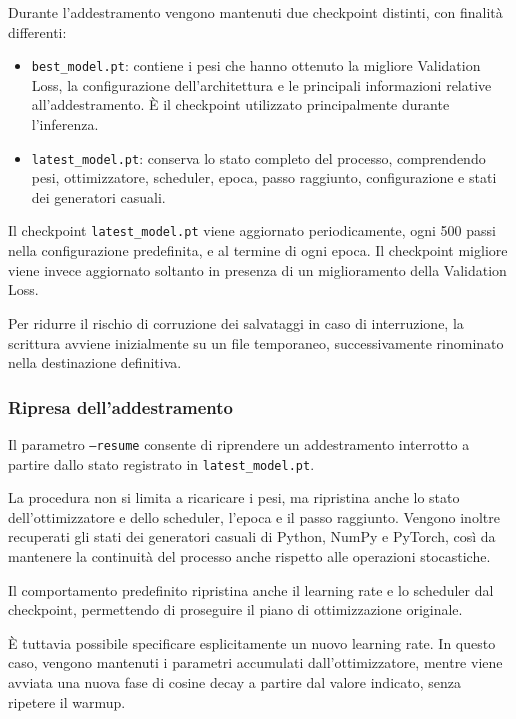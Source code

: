 Durante l'addestramento vengono mantenuti due checkpoint distinti, con finalità differenti:

\begin{itemize}
    \item \texttt{best\_model.pt}: contiene i pesi che hanno ottenuto la migliore Validation Loss, la configurazione dell'architettura e le principali informazioni relative all'addestramento. È il checkpoint utilizzato principalmente durante l'inferenza.
    \item \texttt{latest\_model.pt}: conserva lo stato completo del processo, comprendendo pesi, ottimizzatore, scheduler, epoca, passo raggiunto, configurazione e stati dei generatori casuali.
\end{itemize}

Il checkpoint \texttt{latest\_model.pt} viene aggiornato periodicamente, ogni 500 passi nella configurazione predefinita, e al termine di ogni epoca. Il checkpoint migliore viene invece aggiornato soltanto in presenza di un miglioramento della Validation Loss.

Per ridurre il rischio di corruzione dei salvataggi in caso di interruzione, la scrittura avviene inizialmente su un file temporaneo, successivamente rinominato nella destinazione definitiva.

\subsubsection{Ripresa dell'addestramento}

Il parametro \texttt{--resume} consente di riprendere un addestramento interrotto a partire dallo stato registrato in \texttt{latest\_model.pt}.

La procedura non si limita a ricaricare i pesi, ma ripristina anche lo stato dell'ottimizzatore e dello scheduler, l'epoca e il passo raggiunto. Vengono inoltre recuperati gli stati dei generatori casuali di Python, NumPy e PyTorch, così da mantenere la continuità del processo anche rispetto alle operazioni stocastiche.

Il comportamento predefinito ripristina anche il learning rate e lo scheduler dal checkpoint, permettendo di proseguire il piano di ottimizzazione originale.

È tuttavia possibile specificare esplicitamente un nuovo learning rate. In questo caso, vengono mantenuti i parametri accumulati dall'ottimizzatore, mentre viene avviata una nuova fase di cosine decay a partire dal valore indicato, senza ripetere il warmup.

